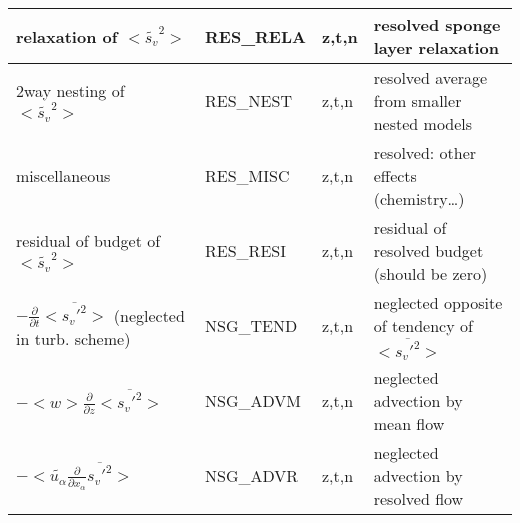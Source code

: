 \begin{longtable}[c]{|p{}|p{}|p{}|p{}|}
{\rm relaxation of }$<\tilde{s_v}^2>$                              & RES\_RELA  & z,t,n & resolved sponge layer relaxation \\\hline
{\rm 2way nesting of }$<\tilde{s_v}^2>$                            & RES\_NEST  & z,t,n & resolved average from smaller nested models \\\hline
{\rm miscellaneous}                                                & RES\_MISC  & z,t,n & resolved: other effects (chemistry\ldots) \\\hline
{\rm residual of budget of} $<\tilde{s_v}^2>$                      & RES\_RESI  & z,t,n & residual of resolved budget (should be zero) \\\hline
$-\frac{\partial }{\partial t}<\overline{s_v'^2}>$ (neglected in turb. scheme) & NSG\_TEND & z,t,n & neglected opposite of tendency of $<\overline{s_v'^2}>$ \\\hline
$-<w>\frac{\partial}{\partial z}<\overline{s_v'^2}>$               & NSG\_ADVM  & z,t,n & neglected advection by mean flow\\\hline
$-<\tilde{u_\alpha}\frac{\partial}{\partial x_\alpha}\overline{s_v'^2}>$  & NSG\_ADVR & z,t,n & neglected advection by resolved flow\\\hline
\end{longtable}
\endgroup
